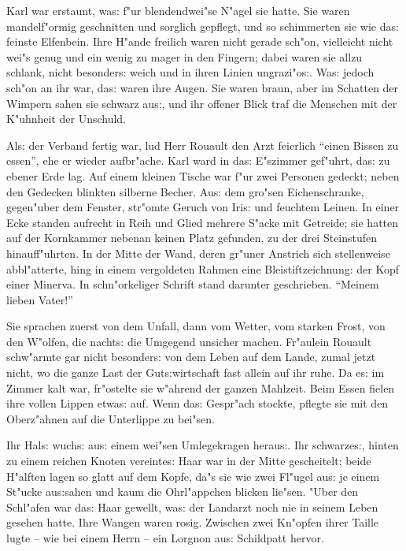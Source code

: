 \documentclass[oneside,12pt]{book}
\newcommand{\s}{s:}%
\begin{document}
Karl war erstaunt, wa{\s} f"ur blendendwei"se N"agel sie hatte.
Sie waren mandelf"ormig geschnitten und sorglich gepflegt, und so
schimmerten sie wie da{\s} feinste Elfenbein. Ihre H"ande freilich
waren nicht gerade sch"on, vielleicht nicht wei"s genug und ein
wenig zu mager in den Fingern; dabei waren sie allzu schlank,
nicht besonder{\s} weich und in ihren Linien ungrazi"o{\s}. Wa{\s}
jedoch sch"on an ihr war, da{\s} waren ihre Augen. Sie waren
braun, aber im Schatten der Wimpern sahen sie schwarz au{\s}, und
ihr offener Blick traf die Menschen mit der K"uhnheit der
Unschuld.

Al{\s} der Verband fertig war, lud Herr Rouault den Arzt feierlich
"`einen Bissen zu essen"', ehe er wieder aufbr"ache. Karl ward in
da{\s} E"szimmer gef"uhrt, da{\s} zu ebener Erde lag. Auf einem
kleinen Tische war f"ur zwei Personen gedeckt; neben den Gedecken
blinkten silberne Becher. Au{\s} dem gro"sen Eichenschranke,
gegen"uber dem Fenster, str"omte Geruch von Iri{\s} und feuchtem
Leinen. In einer Ecke standen aufrecht in Reih und Glied mehrere
S"acke mit Getreide; sie hatten auf der Kornkammer nebenan keinen
Platz gefunden, zu der drei Steinstufen hinauff"uhrten. In der
Mitte der Wand, deren gr"uner Anstrich sich stellenweise
abbl"atterte, hing in einem vergoldeten Rahmen eine
Bleistift\/zeichnung: der Kopf einer Minerva. In schn"orkeliger
Schrift stand darunter geschrieben. "`Meinem lieben Vater!"'

Sie sprachen zuerst von dem Unfall, dann vom Wetter, vom starken
Frost, von den W"olfen, die nacht{\s} die Umgegend unsicher
machen. Fr"aulein Rouault schw"armte gar nicht besonder{\s} von
dem Leben auf dem Lande, zumal jetzt nicht, wo die ganze Last der
Gut{\s}wirtschaft fast allein auf ihr ruhe. Da e{\s} im Zimmer
kalt war, fr"ostelte sie w"ahrend der ganzen Mahlzeit. Beim Essen
fielen ihre vollen Lippen etwa{\s} auf. Wenn da{\s} Gespr"ach
stockte, pflegte sie mit den Oberz"ahnen auf die Unterlippe zu
bei"sen.

Ihr Hal{\s} wuch{\s} au{\s} einem wei"sen Umlegekragen herau{\s}.
Ihr schwarze{\s}, hinten zu einem reichen Knoten vereinte{\s} Haar
war in der Mitte gescheitelt; beide H"alften lagen so glatt auf
dem Kopfe, da"s sie wie zwei Fl"ugel au{\s} je einem St"ucke
au{\s}sahen und kaum die Ohrl"appchen blicken lie"sen. "Uber den
Schl"afen war da{\s} Haar gewellt, wa{\s} der Landarzt noch nie in
seinem Leben gesehen hatte. Ihre Wangen waren rosig. Zwischen zwei
Kn"opfen ihrer Taille lugte -- wie bei einem Herrn -- ein Lorgnon
au{\s} Schildpatt hervor.
\end{document}
